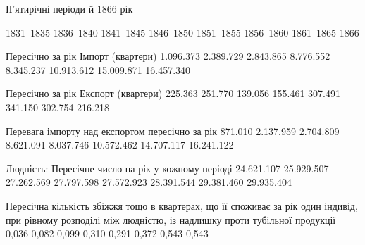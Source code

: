 \parcont{}  %
ІІ'ятирічні періоди й 1866 рік

1831--1835    1836--1840    1841--1845    1846--1850    1851--1855    1856--1860    1861--1865    1866

Пересічно за рік
Імпорт (квартери)  1.096.373    2.389.729    2.843.865    8.776.552    8.345.237    10.913.612
15.009.871    16.457.340

Пересічно за рік
Експорт (квартери)   225.363    251.770    139.056    155.461    307.491    341.150    302.754
216.218

Перевага імпорту над експортом пересічно за рік         871.010    2.137.959    2.704.809
8.621.091    8.037.746    10.572.462    14.707.117    16.241.122

Людність:
Пересічне число на рік у кожному періоді 24.621.107    25.929.507    27.262.569    27.797.598
27.572.923    28.391.544    29.381.460    29.935.404

Пересічна кількість збіжжя тощо в квартерах, що її споживає за рік один індивід, при рівному
розподілі між людністю, із надлишку проти тубільної продукції         0,036    0,082    0,099
0,310    0,291    0,372    0,543    0,543
\parbreak{}  %
